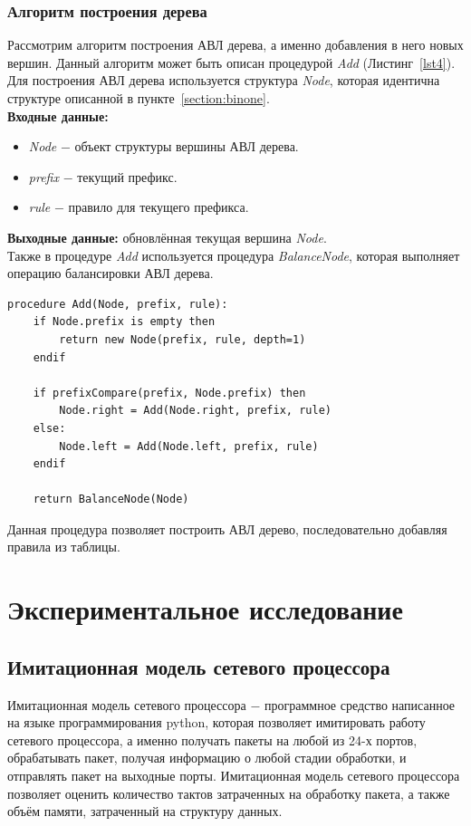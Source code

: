 \documentclass[conference]{IEEEtran}
\begin{document}
            \subsubsection{Алгоритм построения дерева} 
                Рассмотрим алгоритм построения АВЛ дерева, а именно добавления в него новых вершин. Данный алгоритм может быть описан процедурой \emph{Add} (Листинг~\ref{lst4}).
                Для построения АВЛ дерева используется структура \emph{Node}, которая идентична структуре описанной в пункте~\ref{section:binone}.\\
                {\bf Входные данные:}
                \begin{itemize}
                    \item \emph{Node} $-$ объект структуры вершины АВЛ дерева.
                    \item \emph{prefix} $-$ текущий префикс.
                    \item \emph{rule} $-$ правило для текущего префикса.
                \end{itemize}
                {\bf Выходные данные:} обновлённая текущая вершина \emph{Node}.\\
                Также в процедуре \emph{Add} используется процедура \emph{BalanceNode}, которая выполняет операцию балансировки АВЛ дерева.\\
\begin{lstlisting}[caption=Процедура добавления вершины в АВЛ дерево., label=lst4]
procedure Add(Node, prefix, rule):
    if Node.prefix is empty then
        return new Node(prefix, rule, depth=1)
    endif
    
    if prefixCompare(prefix, Node.prefix) then
        Node.right = Add(Node.right, prefix, rule)
    else:
        Node.left = Add(Node.left, prefix, rule)
    endif
    
    return BalanceNode(Node)
\end{lstlisting}
\vspace{1em}
    Данная процедура позволяет построить АВЛ дерево, последовательно добавляя правила из таблицы.
    \section{Экспериментальное исследование}
    \subsection{Имитационная модель сетевого процессора}
        Имитационная модель сетевого процессора $-$ программное средство написанное на языке программирования python, которая позволяет имитировать работу сетевого процессора, 
        а именно получать пакеты на любой из 24-х портов, обрабатывать пакет, получая информацию о любой стадии обработки, и отправлять пакет на выходные порты.
        Имитационная модель сетевого процессора позволяет оценить количество тактов затраченных на обработку пакета, а также объём памяти, затраченный на структуру данных.
        
\end{document}
